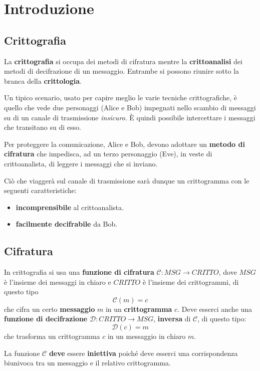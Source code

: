 \chapter{Introduzione}

\section{Crittografia}
La \textbf{crittografia} si occupa dei metodi di cifratura mentre la \textbf{crittoanalisi} dei metodi di decifrazione
di un messaggio. Entrambe si possono riunire sotto la branca della \textbf{crittologia}.

Un tipico scenario, usato per capire meglio le varie tecniche crittografiche, \`e quello che vede due personaggi (Alice
e Bob) impegnati nello scambio di messaggi su di un canale di trasmissione \emph{insicuro}. \`E quindi possibile
intercettare i messaggi che transitano su di esso.

Per proteggere la comunicazione, Alice e Bob, devono adottare un \textbf{metodo di cifratura} che impedisca, ad un terzo
personaggio (Eve), in veste di crittoanalista, di leggere i messaggi che si inviano.

Ci\`o che viagger\`a sul canale di trasmissione sar\`a dunque un crittogramma con le seguenti caratteristiche:
\begin{itemize}
	\item \textbf{incomprensibile} al crittoanalista.
	\item \textbf{facilmente decifrabile} da Bob.
\end{itemize}

\section{Cifratura}
In crittografia si usa una \textbf{funzione di cifratura} $\mathcal{C} : MSG \rightarrow CRITTO$, dove $MSG$ \`e l'insieme
dei messaggi in chiaro e $CRITTO$ \`e l'insieme dei crittogrammi, di questo tipo
\[ \mathcal{C}(m) = c \]
che cifra un certo \textbf{messaggio} $m$ in un \textbf{crittogramma} $c$. Deve esserci anche una
\textbf{funzione di decifrazione} $\mathcal{D} : CRITTO \rightarrow MSG$, \textbf{inversa} di $\mathcal{C}$, di questo
tipo:
\[ \mathcal{D}(c) = m \]
che trasforma un crittogramma $c$ in un messaggio in chiaro $m$.

La funzione $\mathcal{C}$ \textbf{deve} essere \textbf{iniettiva} poich\'e deve esserci una corrispondenza biunivoca
tra un messaggio e il relativo crittogramma.

